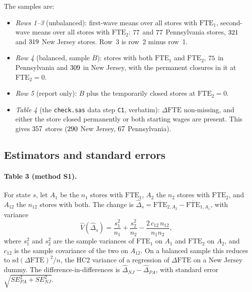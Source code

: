 \documentclass[11pt]{article}
\begin{document}
The samples are:
\begin{itemize}
  \item \emph{Rows 1--3} (unbalanced): first-wave means over all stores with
        $\text{FTE}_1$, second-wave means over all stores with $\text{FTE}_2$:
        $77$ and $77$ Pennsylvania stores, $321$ and $319$ New Jersey
        stores. Row~3 is row~2 minus row~1.
  \item \emph{Row 4} (balanced, sample $B$): stores with both $\text{FTE}_1$ and
        $\text{FTE}_2$, $75$ in Pennsylvania and $309$ in New Jersey, with the
        permanent closures in it at $\text{FTE}_2 = 0$.
  \item \emph{Row 5} (report only): $B$ plus the temporarily closed stores at
        $\text{FTE}_2 = 0$.
  \item \emph{Table 4} (the \texttt{check.sas} data step \texttt{C1}, verbatim):
        $\Delta\text{FTE}$ non-missing, and either the store closed permanently or both
        starting wages are present. This gives $357$ stores ($290$ New Jersey,
        $67$ Pennsylvania).
\end{itemize}

\subsection{Estimators and standard errors}

\paragraph{Table 3 (method S1).} For state $s$, let $A_1$ be the $n_1$ stores with
$\text{FTE}_1$, $A_2$ the $n_2$ stores with $\text{FTE}_2$, and $A_{12}$ the $n_{12}$ stores
with both. The change is $\widehat\Delta_s = \overline{\text{FTE}}_{2,A_2} -
\overline{\text{FTE}}_{1,A_1}$, with variance
\begin{equation*}
  \widehat V(\widehat\Delta_s) = \frac{s_1^2}{n_1} + \frac{s_2^2}{n_2}
     - \frac{2\,c_{12}\,n_{12}}{n_1 n_2},
\end{equation*}
where $s_1^2$ and $s_2^2$ are the sample variances of $\text{FTE}_1$ on $A_1$ and
$\text{FTE}_2$ on $A_2$, and $c_{12}$ is the sample covariance of the two on $A_{12}$. On a
balanced sample this reduces to $\mathrm{sd}(\Delta\text{FTE})^2/n$, the HC2 variance of a
regression of $\Delta\text{FTE}$ on a New Jersey dummy. The difference-in-differences is
$\widehat\Delta_{NJ} - \widehat\Delta_{PA}$, with standard error
$\sqrt{SE_{PA}^2 + SE_{NJ}^2}$.
\end{document}
